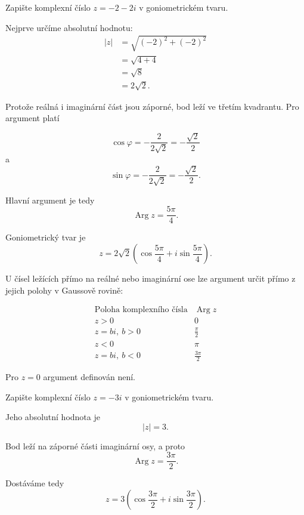 \documentclass[12pt,a4paper]{article}
\begin{document}
\begin{examplebox}
    Zapište komplexní číslo $z=-2-2i$ v goniometrickém tvaru.

    Nejprve určíme absolutní hodnotu:
    \begin{align*}
        |z| &= \sqrt{(-2)^2+(-2)^2} \\
            &= \sqrt{4+4} \\
            &= \sqrt{8} \\
            &= 2\sqrt{2}.
    \end{align*}

    Protože reálná i imaginární část jsou záporné, bod leží ve třetím kvadrantu.
    Pro argument platí

    \[
        \cos\varphi = -\frac{2}{2\sqrt{2}} = -\frac{\sqrt{2}}{2}
    \]
    a
    \[
        \sin\varphi = -\frac{2}{2\sqrt{2}} = -\frac{\sqrt{2}}{2}.
    \]

    Hlavní argument je tedy
    \[
        \operatorname{Arg}z=\frac{5\pi}{4}.
    \]

    Goniometrický tvar je
    \[
        z = 2\sqrt{2} \left(\cos\frac{5\pi}{4} + i\sin\frac{5\pi}{4}\right).
    \]
\end{examplebox}


\begin{notebox}
    U čísel ležících přímo na reálné nebo imaginární ose lze argument určit
    přímo z jejich polohy v Gaussově rovině:

    \[
        \begin{array}{c|c}
            \text{Poloha komplexního čísla} & \operatorname{Arg}z \\ \hline
            z>0 & 0 \\
            z=bi,\ b>0 & \frac{\pi}{2} \\
            z<0 & \pi \\
            z=bi,\ b<0 & \frac{3\pi}{2}
        \end{array}
    \]

    Pro $z=0$ argument definován není.
\end{notebox}


\begin{examplebox}
    Zapište komplexní číslo $z=-3i$ v goniometrickém tvaru.

    Jeho absolutní hodnota je
    \[
        |z|=3.
    \]

    Bod leží na záporné části imaginární osy, a proto
    \[
        \operatorname{Arg}z=\frac{3\pi}{2}.
    \]

    Dostáváme tedy
    \[
        z = 3\left(\cos\frac{3\pi}{2} + i\sin\frac{3\pi}{2}\right).
    \]
\end{examplebox}
\end{document}
